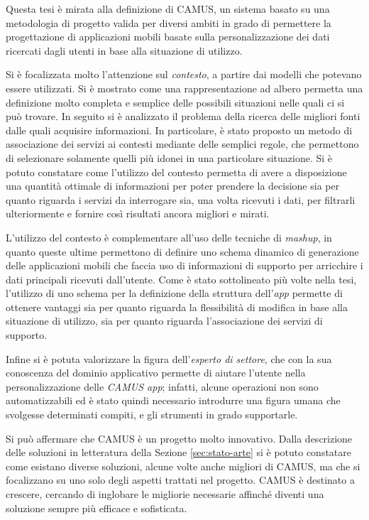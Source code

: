 Questa tesi è mirata alla definizione di CAMUS, un sistema basato su una metodologia di progetto valida per diversi ambiti in grado di permettere la progettazione di applicazioni mobili basate sulla personalizzazione dei dati ricercati dagli utenti in base alla situazione di utilizzo.

Si è focalizzata molto l'attenzione sul \emph{contesto}, a partire dai modelli che potevano essere utilizzati. Si è mostrato come una rappresentazione ad albero permetta una definizione molto completa e semplice delle possibili situazioni nelle quali ci si può trovare. In seguito si è analizzato il problema della ricerca delle migliori fonti dalle quali acquisire informazioni. In particolare, è stato proposto un metodo di associazione dei servizi ai contesti mediante delle semplici regole, che permettono di selezionare solamente quelli più idonei in una particolare situazione. Si è potuto constatare come l'utilizzo del contesto permetta di avere a disposizione una quantità ottimale di informazioni per poter prendere la decisione sia per quanto riguarda i servizi da interrogare sia, una volta ricevuti i dati, per filtrarli ulteriormente e fornire così risultati ancora migliori e mirati.

L'utilizzo del contesto è complementare all'uso delle tecniche di \emph{mashup}, in quanto queste ultime permettono di definire uno schema dinamico di generazione delle applicazioni mobili che faccia uso di informazioni di supporto per arricchire i dati principali ricevuti dall'utente. Come è stato sottolineato più volte nella tesi, l'utilizzo di uno schema per la definizione della struttura dell'\emph{app} permette di ottenere vantaggi sia per quanto riguarda la flessibilità di modifica in base alla situazione di utilizzo, sia per quanto riguarda l'associazione dei servizi di supporto.

Infine si è potuta valorizzare la figura dell'\emph{esperto di settore}, che con la sua conoscenza del dominio applicativo permette di aiutare l'utente nella personalizzazione delle \emph{CAMUS app}; infatti, alcune operazioni non sono automatizzabili ed è stato quindi necessario introdurre una figura umana che svolgesse determinati compiti, e gli strumenti in grado supportarle.

Si può affermare che CAMUS è un progetto molto innovativo. Dalla descrizione delle soluzioni in letteratura della Sezione \ref{sec:stato-arte} si è potuto constatare come esistano diverse soluzioni, alcune volte anche migliori di CAMUS, ma che si focalizzano su uno solo degli aspetti trattati nel progetto. CAMUS è destinato a crescere, cercando di inglobare le migliorie necessarie affinché diventi una soluzione sempre più efficace e sofisticata.

